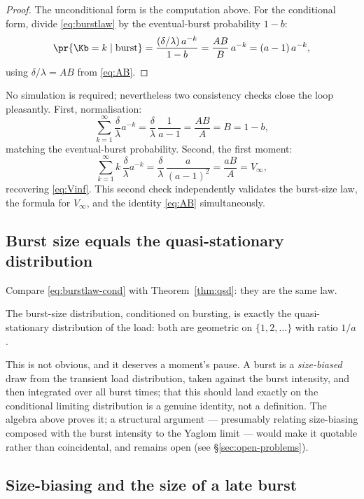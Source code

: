 \begin{proof}
The unconditional form is the computation above. For the conditional form,
divide \eqref{eq:burstlaw} by the eventual-burst probability $1-b$:
$$
\pr{\Kb=k\mid\text{burst}}
=\frac{(\delta/\lambda)\,a^{-k}}{1-b}
=\frac{AB}{B}\,a^{-k}
=(a-1)\,a^{-k},
$$
using $\delta/\lambda=AB$ from \eqref{eq:AB}.
\end{proof}

No simulation is required; nevertheless two consistency checks close the
loop pleasantly. First, normalisation:
$$
\sum_{k=1}^{\infty}\frac{\delta}{\lambda}a^{-k}
=\frac{\delta}{\lambda}\,\frac{1}{a-1}
=\frac{AB}{A}=B=1-b,
$$
matching the eventual-burst probability. Second, the first moment:
$$
\sum_{k=1}^{\infty}k\,\frac{\delta}{\lambda}a^{-k}
=\frac{\delta}{\lambda}\,\frac{a}{(a-1)^2}
=\frac{aB}{A}=V_\infty,
$$
recovering \eqref{eq:Vinf}. This second check independently validates the
burst-size law, the formula for $V_\infty$, and the identity
\eqref{eq:AB} simultaneously.

\subsection{Burst size equals the quasi-stationary distribution}
\label{sec:burst=qsd}

Compare \eqref{eq:burstlaw-cond} with Theorem~\ref{thm:qsd}: they are the
same law.

\begin{corollary}[Burst size $=$ QSD]
\label{cor:burst-qsd}
The burst-size distribution, conditioned on bursting, is exactly the
quasi-stationary distribution of the load: both are geometric on
$\{1,2,\ldots\}$ with ratio $1/a$.
\end{corollary}

This is not obvious, and it deserves a moment's pause. A burst is a
\emph{size-biased} draw from the transient load distribution, taken against
the burst intensity, and then integrated over all burst times; that this
should land exactly on the conditional limiting distribution is a genuine
identity, not a definition. The algebra above proves it; a structural
argument --- presumably relating size-biasing composed with the burst
intensity to the Yaglom limit \cite{yaglom1947certain} --- would make it
quotable rather than coincidental, and remains open
(see \S\ref{sec:open-problems}).

\subsection{Size-biasing and the size of a late burst}
\label{sec:size-bias}

